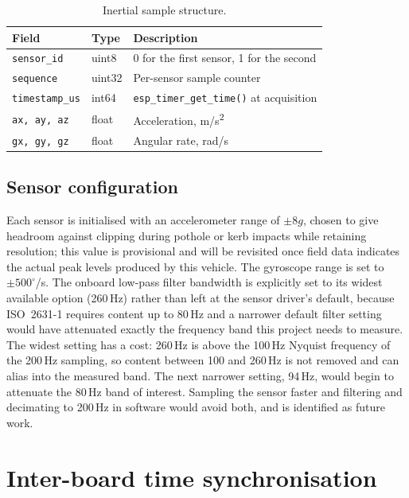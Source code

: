 \begin{table}[ht]
\centering
\caption{Inertial sample structure.}
\label{tab:imu-sample}
\begin{tabular}{|l|l|p{6.5cm}|}
\hline
\textbf{Field} & \textbf{Type} & \textbf{Description} \\ \hline
\texttt{sensor\_id} & uint8 & 0 for the first sensor, 1 for the second \\ \hline
\texttt{sequence} & uint32 & Per-sensor sample counter \\ \hline
\texttt{timestamp\_us} & int64 & \texttt{esp\_timer\_get\_time()} at acquisition \\ \hline
\texttt{ax, ay, az} & float & Acceleration, m/s\textsuperscript{2} \\ \hline
\texttt{gx, gy, gz} & float & Angular rate, rad/s \\ \hline
\end{tabular}
\end{table}

\subsection{Sensor configuration}

Each sensor is initialised with an accelerometer range of $\pm8g$, chosen to give headroom against clipping during pothole or kerb impacts while retaining resolution; this value is provisional and will be revisited once field data indicates the actual peak levels produced by this vehicle. The gyroscope range is set to $\pm500^{\circ}$/s. The onboard low-pass filter bandwidth is explicitly set to its widest available option (260\,Hz) rather than left at the sensor driver's default, because ISO~2631-1 requires content up to 80\,Hz and a narrower default filter setting would have attenuated exactly the frequency band this project needs to measure. The widest setting has a cost: 260\,Hz is above the 100\,Hz Nyquist frequency of the 200\,Hz sampling, so content between 100 and 260\,Hz is not removed and can alias into the measured band. The next narrower setting, 94\,Hz, would begin to attenuate the 80\,Hz band of interest. Sampling the sensor faster and filtering and decimating to 200\,Hz in software would avoid both, and is identified as future work.

\section{Inter-board time synchronisation}
\label{sec:sync-pulse}

